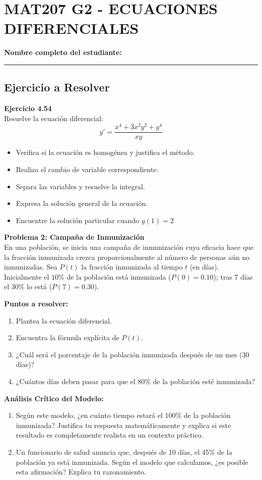 \documentclass[8pt]{article}
\begin{document}
\vspace{1cm}

\section*{MAT207 G2 - ECUACIONES DIFERENCIALES}

\textbf{Nombre completo del estudiante:} \rule{12cm}{0.4pt}

\subsection*{Ejercicio a Resolver}
\textbf{Ejercicio 4.54}
\\
Resuelve la ecuaci\'on diferencial:
\[
y' = \frac{x^4 + 3x^2y^2 + y^4}{xy}
\]
\begin{itemize}[leftmargin=2em]
    \item Verifica si la ecuaci\'on es homog\'enea y justifica el m\'etodo.
    \item Realiza el cambio de variable correspondiente.
    \item Separa las variables y resuelve la integral.
    \item Expresa la soluci\'on general de la ecuaci\'on.
    \item Encuentre la soluci\'on particular cuando $y(1) = 2$
\end{itemize}


\textbf{Problema 2: Campa\~na de Inmunizaci\'on}
\\
En una poblaci\'on, se inicia una campa\~na de inmunizaci\'on cuya eficacia hace que la fracci\'on inmunizada crezca proporcionalmente al n\'umero de personas a\'un no inmunizadas. Sea $P(t)$ la fracci\'on inmunizada al tiempo $t$ (en d\'ias). Inicialmente el $10\%$ de la poblaci\'on est\'a inmunizada ($P(0) = 0.10$); tras 7 d\'ias el $30\%$ lo est\'a ($P(7) = 0.30$).

\textbf{Puntos a resolver:}
\begin{enumerate}[label=\textbf{\Alph*.},leftmargin=2em]
    \item Plantea la ecuaci\'on diferencial.
    \item Encuentra la f\'ormula expl\'icita de $P(t)$.
    \item ¿Cuál será el porcentaje de la población inmunizada después de un mes (30 días)?
    \item ¿Cuántos días deben pasar para que el 80\% de la población esté inmunizada?
\end{enumerate}

\textbf{An\'alisis Cr\'itico del Modelo:}
\begin{enumerate}[label=\textbf{E\arabic*.},leftmargin=2em]
    \item Según este modelo, ¿en cuánto tiempo estará el 100\% de la población inmunizada? Justifica tu respuesta matemáticamente y explica si este resultado es completamente realista en un contexto práctico.
    \item Un funcionario de salud anuncia que, después de 10 días, el 45\% de la población ya está inmunizada. Según el modelo que calculamos, ¿es posible esta afirmación? Explica tu razonamiento.
\end{enumerate}
\end{document}
